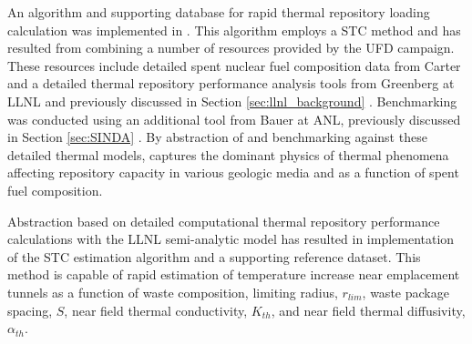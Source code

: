 
An algorithm and supporting database for rapid thermal repository loading 
calculation was implemented in \Cyder.  This algorithm employs a \gls{STC} 
method \cite{radel_effect_2007, radel_repository_2007} and has resulted from 
combining a number of resources provided by the \gls{UFD} campaign.  These 
resources include detailed spent nuclear fuel composition data from Carter 
\cite{carter_fuel_2011} and a detailed thermal repository performance analysis 
tools from Greenberg at \gls{LLNL} and previously discussed in Section 
\ref{sec:llnl_background} \cite{greenberg_application_2012}. 
Benchmarking was conducted using an additional tool from Bauer 
at \gls{ANL}, previously discussed in Section \ref{sec:SINDA} \cite{huff_numerical_2012}. By abstraction of and benchmarking against 
these detailed thermal models, \Cyder captures the dominant physics of thermal 
phenomena affecting repository capacity in various geologic media and as a 
function of spent fuel composition.

Abstraction based on detailed computational thermal repository performance 
calculations with the \gls{LLNL} semi-analytic model has resulted in implementation 
of the \gls{STC} estimation algorithm and a supporting reference dataset.  This 
method is capable of rapid estimation of temperature increase near emplacement 
tunnels as a function of waste composition, limiting radius, $r_{lim}$, waste 
package spacing, $S$, near field thermal conductivity, $K_{th}$, and near field 
thermal diffusivity, $\alpha_{th}$.
